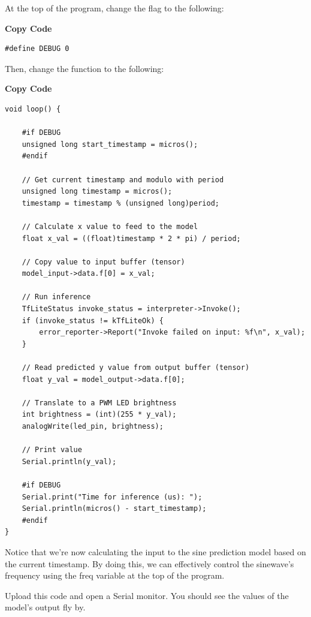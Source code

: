 At the top of the program, change the  flag to the following:



\medskip 

\textbf{Copy Code}

\begin{lstlisting}
#define DEBUG 0
\end{lstlisting}




Then, change the  function to the following:



\medskip

\textbf{Copy Code}


\begin{lstlisting}
void loop() {
    
    #if DEBUG
    unsigned long start_timestamp = micros();
    #endif
    
    // Get current timestamp and modulo with period
    unsigned long timestamp = micros();
    timestamp = timestamp % (unsigned long)period;
    
    // Calculate x value to feed to the model
    float x_val = ((float)timestamp * 2 * pi) / period;
    
    // Copy value to input buffer (tensor)
    model_input->data.f[0] = x_val;
    
    // Run inference
    TfLiteStatus invoke_status = interpreter->Invoke();
    if (invoke_status != kTfLiteOk) {
        error_reporter->Report("Invoke failed on input: %f\n", x_val);
    }
    
    // Read predicted y value from output buffer (tensor)
    float y_val = model_output->data.f[0];
    
    // Translate to a PWM LED brightness
    int brightness = (int)(255 * y_val);
    analogWrite(led_pin, brightness);
    
    // Print value
    Serial.println(y_val);
    
    #if DEBUG
    Serial.print("Time for inference (us): ");
    Serial.println(micros() - start_timestamp);
    #endif
}
\end{lstlisting}



Notice that we're now calculating the input to the sine prediction model based on the current timestamp. By doing this, we can effectively control the sinewave’s frequency using the freq variable at the top of the program.

Upload this code and open a Serial monitor. You should see the values of the model’s output fly by.


